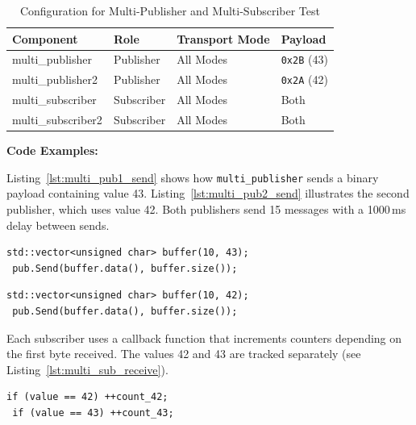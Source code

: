 \begin{table}[H]
	\centering
	\begin{tabular}{@{}llll@{}}
		\toprule
		\textbf{Component}     & \textbf{Role}    & \textbf{Transport Mode} & \textbf{Payload} \\
		\midrule
		multi\_publisher       & Publisher        & All Modes               & \texttt{0x2B} (43) \\
		multi\_publisher2      & Publisher        & All Modes               & \texttt{0x2A} (42) \\
		multi\_subscriber      & Subscriber       & All Modes               & Both              \\
		multi\_subscriber2     & Subscriber       & All Modes               & Both              \\
		\bottomrule
	\end{tabular}
	\caption{Configuration for Multi-Publisher and Multi-Subscriber Test}
	\label{tab:multi_pub_sub_test}
\end{table}

\textbf{Code Examples:}
\vspace{0.4em}

Listing~\ref{lst:multi_pub1_send} shows how \texttt{multi\_publisher} sends a binary payload containing value 43. Listing~\ref{lst:multi_pub2_send} illustrates the second publisher, which uses value 42. Both publishers send 15 messages with a 1000\,ms delay between sends.
\vspace{0.5em}
\begin{lstlisting}[style=cppstyle, caption={Publisher 1 sends 0x2B (43)}, label={lst:multi_pub1_send}, captionpos=b]
 std::vector<unsigned char> buffer(10, 43);
 pub.Send(buffer.data(), buffer.size());
\end{lstlisting}
\vspace{0.5em}
\begin{lstlisting}[style=cppstyle, caption={Publisher 2 sends 0x2A (42)}, label={lst:multi_pub2_send}, captionpos=b]
 std::vector<unsigned char> buffer(10, 42);
 pub.Send(buffer.data(), buffer.size());
\end{lstlisting}

Each subscriber uses a callback function that increments counters depending on the first byte received. The values 42 and 43 are tracked separately (see Listing~\ref{lst:multi_sub_receive}).
\vspace{0.5em}
\begin{lstlisting}[style=cppstyle, caption={Subscriber callback counting 42 and 43}, label={lst:multi_sub_receive}, captionpos=b]
 if (value == 42) ++count_42;
 if (value == 43) ++count_43;
\end{lstlisting}

